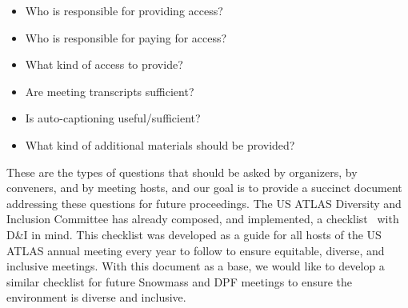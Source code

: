 \documentclass{article}
\begin{document}
\begin{itemize}
  \item Who is responsible for providing access?
  \item Who is responsible for paying for access?
  \item What kind of access to provide?
  \item Are meeting transcripts sufficient?
  \item Is auto-captioning useful/sufficient?
  \item What kind of additional materials should be provided?
\end{itemize}


  These are the types of questions that should be asked by organizers, by conveners, and by meeting hosts, and our goal is to provide a succinct document addressing these questions for future proceedings. The US ATLAS Diversity and Inclusion Committee has already composed, and implemented, a checklist~\cite{USATLASChecklist}  with D\&I in mind. This checklist was developed as a guide for all hosts of the US ATLAS annual meeting every year to follow to ensure equitable, diverse, and inclusive meetings. With this document as a base, we would like to develop a similar checklist for future Snowmass and DPF meetings to ensure the environment is diverse and inclusive.

 \printbibliography
\end{document}
